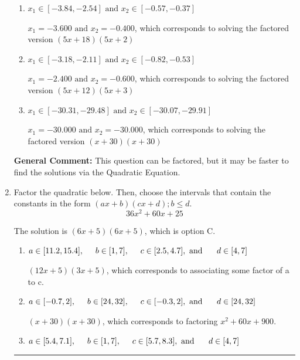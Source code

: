 \documentclass{extbook}[14pt]
\newcommand{\litem}[1]{\item #1

\rule{\textwidth}{0.4pt}}
\begin{document}
\begin{enumerate}
{\begin{enumerate}[label=\Alph*.]
* $x_1 = -1.200 \text{ and } x_2 = -1.200$, which is the correct option. Obtained by solving the factored version $(5x + 6)(5x + 6)$
\item \( x_1 \in [-3.84, -2.54] \text{ and } x_2 \in [-0.57, -0.37] \)

$x_1 = -3.600 \text{ and } x_2 = -0.400$, which corresponds to solving the factored version $(5x + 18)(5x + 2)$
\item \( x_1 \in [-3.18, -2.11] \text{ and } x_2 \in [-0.82, -0.53] \)

$x_1 = -2.400 \text{ and } x_2 = -0.600$, which corresponds to solving the factored version $(5x + 12)(5x + 3)$
\item \( x_1 \in [-30.31, -29.48] \text{ and } x_2 \in [-30.07, -29.91] \)

$x_1 = -30.000 \text{ and } x_2 = -30.000$, which corresponds to solving the factored version $(x + 30)(x + 30)$
\end{enumerate}

\textbf{General Comment:} This question can be factored, but it may be faster to find the solutions via the Quadratic Equation.
}
\litem{
Factor the quadratic below. Then, choose the intervals that contain the constants in the form $(ax+b)(cx+d); b \leq d.$
\[ 36x^{2} +60 x + 25 \]

The solution is \( (6x + 5)(6x + 5) \), which is option C.\begin{enumerate}[label=\Alph*.]
\item \( a \in [11.2, 15.4], \hspace*{5mm} b \in [1, 7], \hspace*{5mm} c \in [2.5, 4.7], \text{ and } \hspace*{5mm} d \in [4, 7] \)

 $(12x + 5)(3x + 5)$, which corresponds to associating some factor of a to c.
\item \( a \in [-0.7, 2], \hspace*{5mm} b \in [24, 32], \hspace*{5mm} c \in [-0.3, 2], \text{ and } \hspace*{5mm} d \in [24, 32] \)

 $(x + 30)(x + 30)$, which corresponds to factoring $x^{2} +60 x + 900$.
\item \( a \in [5.4, 7.1], \hspace*{5mm} b \in [1, 7], \hspace*{5mm} c \in [5.7, 8.3], \text{ and } \hspace*{5mm} d \in [4, 7] \)


\end{enumerate}}
\end{enumerate}
\end{document}
